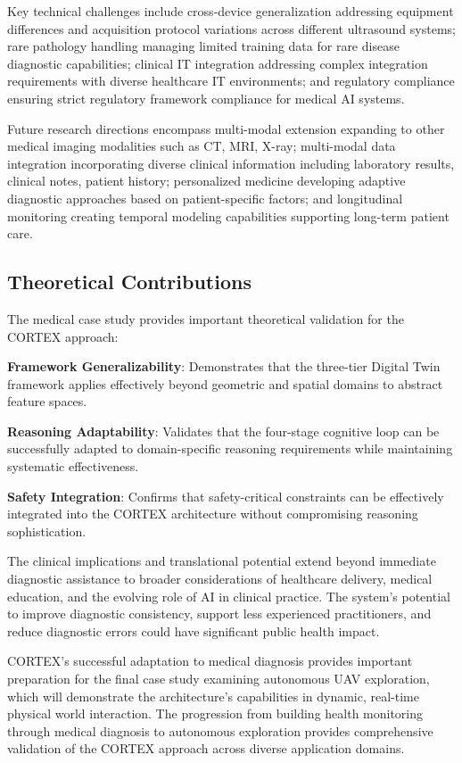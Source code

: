 Key technical challenges include cross-device generalization addressing equipment differences and acquisition protocol variations across different ultrasound systems; rare pathology handling managing limited training data for rare disease diagnostic capabilities; clinical IT integration addressing complex integration requirements with diverse healthcare IT environments; and regulatory compliance ensuring strict regulatory framework compliance for medical AI systems.

Future research directions encompass multi-modal extension expanding to other medical imaging modalities such as CT, MRI, X-ray; multi-modal data integration incorporating diverse clinical information including laboratory results, clinical notes, patient history; personalized medicine developing adaptive diagnostic approaches based on patient-specific factors; and longitudinal monitoring creating temporal modeling capabilities supporting long-term patient care.

\subsection{Theoretical Contributions}

The medical case study provides important theoretical validation for the CORTEX approach:

\textbf{Framework Generalizability}: Demonstrates that the three-tier Digital Twin framework applies effectively beyond geometric and spatial domains to abstract feature spaces.

\textbf{Reasoning Adaptability}: Validates that the four-stage cognitive loop can be successfully adapted to domain-specific reasoning requirements while maintaining systematic effectiveness.

\textbf{Safety Integration}: Confirms that safety-critical constraints can be effectively integrated into the CORTEX architecture without compromising reasoning sophistication.

The clinical implications and translational potential extend beyond immediate diagnostic assistance to broader considerations of healthcare delivery, medical education, and the evolving role of AI in clinical practice. The system's potential to improve diagnostic consistency, support less experienced practitioners, and reduce diagnostic errors could have significant public health impact.

CORTEX's successful adaptation to medical diagnosis provides important preparation for the final case study examining autonomous UAV exploration, which will demonstrate the architecture's capabilities in dynamic, real-time physical world interaction. The progression from building health monitoring through medical diagnosis to autonomous exploration provides comprehensive validation of the CORTEX approach across diverse application domains.